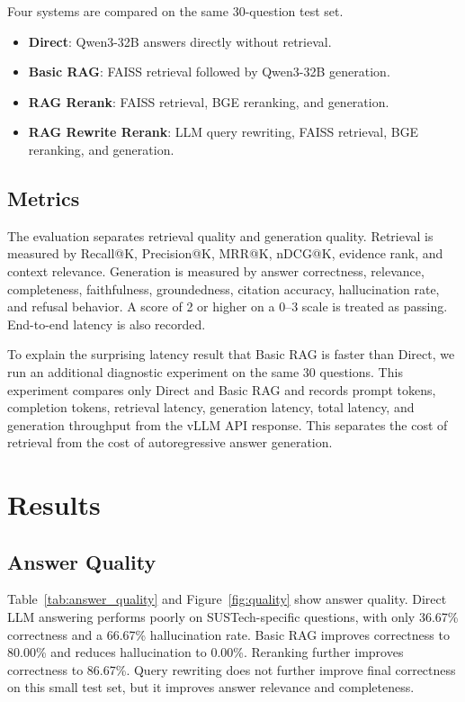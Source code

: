 Four systems are compared on the same 30-question test set.

\begin{itemize}
    \item \textbf{Direct}: Qwen3-32B answers directly without retrieval.
    \item \textbf{Basic RAG}: FAISS retrieval followed by Qwen3-32B generation.
    \item \textbf{RAG Rerank}: FAISS retrieval, BGE reranking, and generation.
    \item \textbf{RAG Rewrite Rerank}: LLM query rewriting, FAISS retrieval, BGE reranking, and generation.
\end{itemize}

\subsection{Metrics}

The evaluation separates retrieval quality and generation quality. Retrieval is measured by Recall@K, Precision@K, MRR@K, nDCG@K, evidence rank, and context relevance. Generation is measured by answer correctness, relevance, completeness, faithfulness, groundedness, citation accuracy, hallucination rate, and refusal behavior. A score of 2 or higher on a 0--3 scale is treated as passing. End-to-end latency is also recorded.

To explain the surprising latency result that Basic RAG is faster than Direct, we run an additional diagnostic experiment on the same 30 questions. This experiment compares only Direct and Basic RAG and records prompt tokens, completion tokens, retrieval latency, generation latency, total latency, and generation throughput from the vLLM API response. This separates the cost of retrieval from the cost of autoregressive answer generation.

\section{Results}

\subsection{Answer Quality}

Table~\ref{tab:answer_quality} and Figure~\ref{fig:quality} show answer quality. Direct LLM answering performs poorly on SUSTech-specific questions, with only 36.67\% correctness and a 66.67\% hallucination rate. Basic RAG improves correctness to 80.00\% and reduces hallucination to 0.00\%. Reranking further improves correctness to 86.67\%. Query rewriting does not further improve final correctness on this small test set, but it improves answer relevance and completeness.

